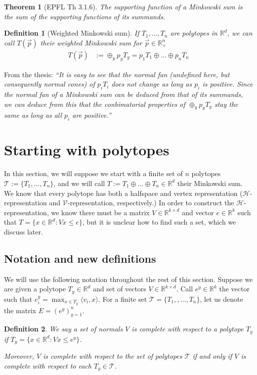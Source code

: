 \documentclass[12pt]{article}
\newcommand{\reals}{\mathbb{R}}
\renewcommand{\H}{\mathcal{H}}
\newcommand{\T}{\mathcal{T}}
\newcommand{\V}{\mathcal{V}}
\newcommand{\inprod}[2]{\langle #1, #2 \rangle}%
\newtheorem{theorem}{Theorem}
\newtheorem{definition}{Definition}
\begin{document}
\begin{theorem}[EPFL Th 3.1.6]\label{thm:support-minksum}
  The supporting function of a Minkowski sum is the sum of the supporting functions of its summands.
\end{theorem}

\begin{definition}[Weighted Minkowski sum]
  If $T_1, \ldots, T_n$ are polytopes in $\reals^d$, we can call $T(\vec p)$ their \emph{weighted} Minkowski sum for $\vec p \in \reals^n_+$
  \begin{align*}
    T(\vec p) &:= \oplus_y p_y T_y = p_1 T_1 \oplus \ldots \oplus p_n T_n
  \end{align*}
\end{definition}

  From the thesis:  \emph{``It is easy to see that the normal fan (undefined here, but consequently normal cones) of $p_i T_i$ does not change as long as $p_i$ is positive.  Since the normal fan of a Minkowski sum can be deduced from that of its summands, we can deduce from this that the conbimatorial properties of $\oplus_y p_y T_y$ stay the same as long as all $p_i$ are positive.''}

  \section{Starting with polytopes}\label{sec:start-polytope}
  In this section, we will suppose we start with a finite set of $n$ polytopes $\T := \{T_1, \ldots, T_n\}$, and we will call $T := T_1 \oplus \ldots \oplus T_n \in \reals^d$ their Minkowski sum.
  We know that every polytope has both a halfspace and vertex representation ($\H$-representation and $\V$-representation, respectively.)
  In order to construct the $\H$-representation, we know there must be a matrix $V \in \reals^{k \times d}$ and vector $e \in \reals^k$ such that $T = \{x \in \reals^d : Vx \leq e\}$, but it is unclear how to find such a set, which we discuss later.

  \subsection{Notation and new definitions}
  We will use the following notation throughout the rest of this section.
  Suppose we are given a polytope $T_y \in \reals^d$ and set of vectors $V \in \reals^{k \times d}$.
  Call $e^y \in \reals^k$ the vector such that $e^y_i = \max_{x \in T_y}\inprod{v_i}{x}$.  
  For a finite set $\T = \{T_1, , \ldots, T_n\}$, let us denote the matrix $E = (e^y)_{y=1}^n$.
  \begin{definition}
    We say a set of normals $V$ is \emph{complete} with respect to a polytope $T_y$ if $T_y = \{x \in \reals^d: Vx \leq e^y\}$.

    Moreover, $V$ is complete with respect to the set of polytopes $\T$ if and only if $V$ is complete with respect to each $T_y \in \T$.
  \end{definition}
\end{document}
